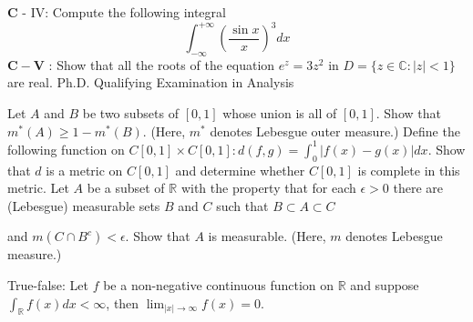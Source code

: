 \documentclass[14pt]{extarticle}
\begin{document}
$\mathbf{C}$ - IV: Compute the following integral
$$
\int_{-\infty}^{+\infty}\left(\frac{\sin x}{x}\right)^{3} d x
$$
\newpage
$\mathbf{C}-\mathbf{V}$ : Show that all the roots of the equation $e^{z}=3 z^{2}$ in $D=\{z \in \mathbb{C}:|z|<1\}$ are real. Ph.D. Qualifying Examination in Analysis
\newpage

Let $A$ and $B$ be two subsets of $[0,1]$ whose union is all of $[0,1]$. Show that $m^{*}(A) \geq 1-m^{*}(B)$. (Here, $m^{*}$ denotes Lebesgue outer measure.)
\newpage
Define the following function on $C[0,1] \times C[0,1]: d(f, g)=\int_{0}^{1}|f(x)-g(x)| d x$. Show that $d$ is a metric on $C[0,1]$ and determine whether $C[0,1]$ is complete in this metric.
\newpage
Let $A$ be a subset of $\mathbb{R}$ with the property that for each $\epsilon>0$ there are (Lebesgue) measurable sets $B$ and $C$ such that
$B \subset A \subset C$

and $m\left(C \cap B^{c}\right)<\epsilon$. Show that $A$ is measurable. (Here, $m$ denotes Lebesgue measure.)

\newpage

True-false: Let $f$ be a non-negative continuous function on $\mathbb{R}$ and suppose $\int_{\mathbb{R}} f(x) d x<\infty$, then $\lim _{|x| \rightarrow \infty} f(x)=0 .$
\newpage
\end{document}

